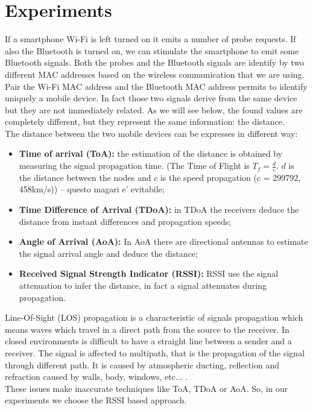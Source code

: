 \chapter{Experiments}
\label{capitolo5}
\thispagestyle{empty}
If a smartphone Wi-Fi is left turned on it emits a number of probe requests. If also the Bluetooth is turned on, we can stimulate the smartphone to emit some Bluetooth signals. Both the probes and the Bluetooth signals are identify by two different MAC addresses based on the wireless communication that we are using.\\
Pair the Wi-Fi MAC address and the Bluetooth MAC address permits to identify uniquely a mobile device. In fact those two signals derive from the same device but they are not immediately related. As we will see below, the found values are completely different, but they represent the same information: the distance.\\
\linebreak
The distance between the two mobile devices can be expresses in different way:
\begin{itemize}
\item \textbf{Time of arrival (ToA):} the estimation of the distance is obtained by measuring the signal propagation time. (The Time of Flight is \(T_f = \frac{d}{c}\). \(d\) is the distance between the nodes and \(c\) is the speed propagation (c = 299792, 458km/s)) -- questo magari e' evitabile;
\item \textbf{Time Difference of Arrival (TDoA):} in TDoA the receivers deduce the distance from instant differences and propagation speeds;
\item \textbf{Angle of Arrival (AoA):} In AoA there are directional antennas to estimate the signal arrival angle and deduce the distance;
\item \textbf{Received Signal Strength Indicator (RSSI):} RSSI use the signal attenuation to infer the distance, in fact a signal attenuates during propagation.
\end{itemize}
Line-Of-Sight (LOS) propagation is a characteristic of signals propagation which means waves which travel in a direct path from the source to the receiver. In closed environments is difficult to have a straight line between a sender and a receiver. The signal is affected to multipath, that is the propagation of the signal through different path. It is caused by atmospheric ducting, reflection and refraction caused by walls, body, windows, etc... .\\
These issues make inaccurate techniques like ToA, TDoA or AoA. So, in our experiments we choose the RSSI based approach.\\
